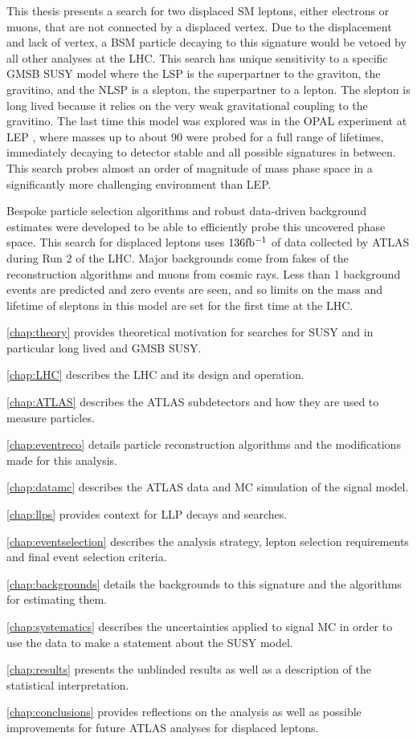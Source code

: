 This thesis presents a search for two displaced \ac{SM} leptons, either electrons or muons, that are not connected by a displaced vertex. Due to the displacement and lack of vertex, a \ac{BSM} particle decaying to this signature would be vetoed by all other analyses at the \ac{LHC}. This search has unique sensitivity to a specific \acf{GMSB} \acf{SUSY} model where the \acf{LSP} is the superpartner to the graviton, the gravitino, and the \acf{NLSP} is a slepton, the superpartner to a lepton. The slepton is long lived because it relies on the very weak gravitational coupling to the gravitino. The last time this model was explored was in the OPAL experiment at \acf{LEP} \cite{opal}, where masses up to about 90 \GeV were probed for a full range of lifetimes, immediately decaying to detector stable and all possible signatures in between. This search probes almost an order of magnitude of mass phase space in a significantly more challenging environment than \ac{LEP}.

Bespoke particle selection algorithms and robust data-driven background estimates were developed to be able to efficiently probe this uncovered phase space. This search for displaced leptons uses $136 \mbox{fb\(^{-1}\)}$ of data collected by \ac{ATLAS} during Run 2 of the \ac{LHC}. Major backgrounds come from fakes of the reconstruction algorithms and muons from cosmic rays. Less than 1 background events are predicted and zero events are seen, and so limits on the mass and lifetime of sleptons in this model are set for the first time at the \ac{LHC}. 

\autoref{chap:theory} provides theoretical motivation for searches for \ac{SUSY} and in particular long lived and \ac{GMSB} \ac{SUSY}.

\autoref{chap:LHC} describes the \ac{LHC} and its design and operation.

\autoref{chap:ATLAS} describes the \ac{ATLAS} subdetectors and how they are used to measure particles.

\autoref{chap:eventreco} details particle reconstruction algorithms and the modifications made for this analysis.

\autoref{chap:datamc} describes the \ac{ATLAS} data and \acf{MC} simulation of the signal model.

\autoref{chap:llps} provides context for \ac{LLP} decays and searches.

\autoref{chap:eventselection} describes the analysis strategy, lepton selection requirements and final event selection criteria.

\autoref{chap:backgrounds} details the backgrounds to this signature and the algorithms for estimating them.

\autoref{chap:systematics} describes the uncertainties applied to signal \ac{MC} in order to use the data to make a statement about the \ac{SUSY} model.

\autoref{chap:results} presents the unblinded results as well as a description of the statistical interpretation. 

\autoref{chap:conclusions} provides reflections on the analysis as well as possible improvements for future \ac{ATLAS} analyses for displaced leptons.


